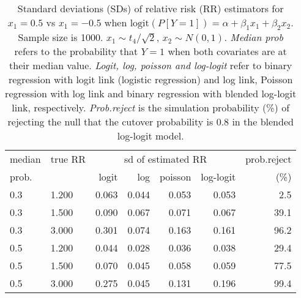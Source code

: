 \documentclass[12pt,a4paper]{article}
\begin{document}
\begin{table}[H] 
\small\sf\centering 
\caption{Standard deviations (SDs) of relative risk (RR) estimators for $x_1=0.5$ vs $x_1=-0.5$ when $\mbox{logit}(P[Y=1])=\alpha+\beta_1 x_1 + \beta_2 x_2$. Sample size is 1000. $x_1 \sim $$t_4/\sqrt{2}$, $x_2 \sim N(0,1)$. {\it Median prob} refers to the probability that $Y=1$ when both covariates are at their median value. {\it Logit, log, poisson and log-logit} refer to binary regression with logit link (logistic regression) and log link, Poisson regression with log link and binary regression with blended log-logit link, respectively. {\it Prob.reject} is the simulation probability (\%) of rejecting the null that the cutover probability is $0.8$ in the blended log-logit model.} 
\begin{tabular}{llrrrrr} 
\toprule 
median & true RR & \multicolumn{4}{c}{sd of estimated RR} & prob.reject \\ 
prob. & & logit & log & poisson & log-logit  & (\%) \\ \midrule 
0.3 & 1.200 & 0.063 & 0.044 & 0.053 & 0.053 &  2.5 \\  
0.3 & 1.500 & 0.090 & 0.067 & 0.071 & 0.067 & 39.1 \\  
0.3 & 3.000 & 0.301 & 0.074 & 0.163 & 0.161 & 96.2 \\  
0.5 & 1.200 & 0.044 & 0.028 & 0.036 & 0.038 & 29.4 \\  
0.5 & 1.500 & 0.070 & 0.045 & 0.058 & 0.059 & 77.5 \\  
0.5 & 3.000 & 0.275 & 0.045 & 0.131 & 0.196 & 99.4 \\  
\bottomrule 
\end{tabular} 
\end{table} 
\end{document}
